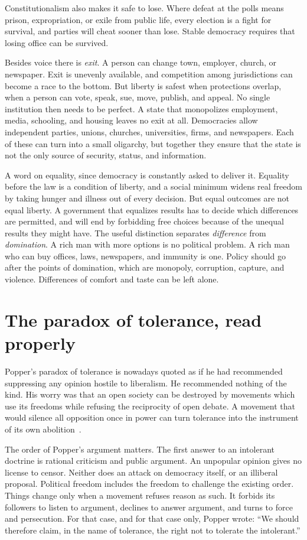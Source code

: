 \documentclass[12pt,a4paper]{book}
\begin{document}
Constitutionalism also makes it safe to lose. Where defeat at the polls means prison, expropriation, or exile from public life, every election is a fight for survival, and parties will cheat sooner than lose. Stable democracy requires that losing office can be survived.

Besides voice there is \emph{exit}. A person can change town, employer, church, or newspaper. Exit is unevenly available, and competition among jurisdictions can become a race to the bottom. But liberty is safest when protections overlap, when a person can vote, speak, sue, move, publish, and appeal. No single institution then needs to be perfect. A state that monopolizes employment, media, schooling, and housing leaves no exit at all. Democracies allow independent parties, unions, churches, universities, firms, and newspapers. Each of these can turn into a small oligarchy, but together they ensure that the state is not the only source of security, status, and information.

A word on equality, since democracy is constantly asked to deliver it. Equality before the law is a condition of liberty, and a social minimum widens real freedom by taking hunger and illness out of every decision. But equal outcomes are not equal liberty. A government that equalizes results has to decide which differences are permitted, and will end by forbidding free choices because of the unequal results they might have. The useful distinction separates \emph{difference} from \emph{domination}. A rich man with more options is no political problem. A rich man who can buy offices, laws, newspapers, and immunity is one. Policy should go after the points of domination, which are monopoly, corruption, capture, and violence. Differences of comfort and taste can be left alone.

\section{The paradox of tolerance, read properly}

Popper's paradox of tolerance is nowadays quoted as if he had recommended suppressing any opinion hostile to liberalism. He recommended nothing of the kind. His worry was that an open society can be destroyed by movements which use its freedoms while refusing the reciprocity of open debate. A movement that would silence all opposition once in power can turn tolerance into the instrument of its own abolition~\cite{Popper-TOSAIE}.

The order of Popper's argument matters. The first answer to an intolerant doctrine is rational criticism and public argument. An unpopular opinion gives no license to censor. Neither does an attack on democracy itself, or an illiberal proposal. Political freedom includes the freedom to challenge the existing order. Things change only when a movement refuses reason as such. It forbids its followers to listen to argument, declines to answer argument, and turns to force and persecution. For that case, and for that case only, Popper wrote: ``We should therefore claim, in the name of tolerance, the right not to tolerate the intolerant.''
\end{document}

